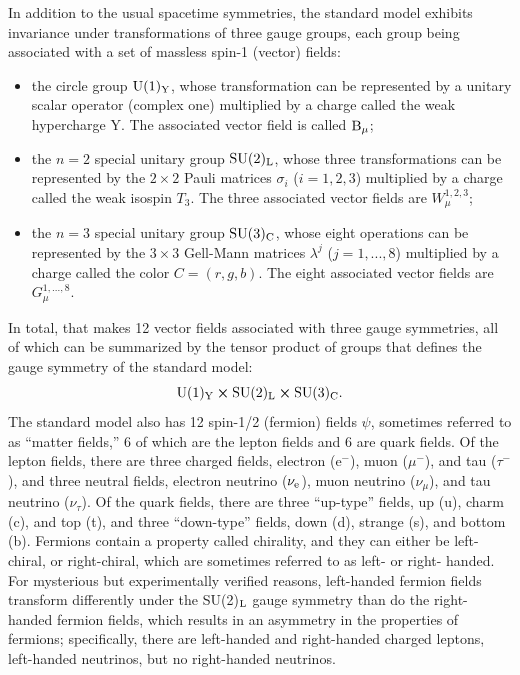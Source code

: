 In addition to the usual spacetime symmetries, the standard model exhibits invariance under transformations of three gauge groups, each group being associated with a set of massless spin-1 (vector) fields:
\begin{itemize}
\item the circle group $\rm U(1)_{Y}$, whose transformation can be represented by a unitary scalar operator (complex one) multiplied by a charge called the weak hypercharge Y. The associated vector field is called ${\rm B}_{\mu}$;
\item the $n=2$ special unitary group $\rm SU(2)_{L}$, whose three transformations can be represented by the $2\times2$ Pauli matrices $\sigma_{i}$ ($i=1,2,3$) multiplied by a charge called the weak isospin $T_3$. The three associated vector fields are $W_{\mu}^{1,2,3}$;
\item the $n=3$ special unitary group $\rm SU(3)_{C}$, whose eight operations can be represented by the $3\times3$ Gell-Mann matrices $\lambda^{j}$ ($j=1,...,8$) multiplied by a charge called the color $C=(r,g,b)$. The eight associated vector fields are $G_{\mu}^{1,...,8}$.
\end{itemize}
In total, that makes 12 vector fields associated with three gauge symmetries, all of which can be summarized by the tensor product of groups that defines the gauge symmetry of the standard model:
\begin{equation}
\rm U(1)_{Y} \cross \rm SU(2)_{L} \cross \rm SU(3)_{C}.
\label{eq:symm}
\end{equation}
The standard model also has 12 spin-1/2 (fermion) fields $\psi$, sometimes referred to as ``matter fields,'' 6 of which are the lepton fields and 6 are quark fields.  Of the lepton fields, there are three charged fields, electron (e$^-$), muon ($\mu^-$), and tau ($\tau^-$), and three neutral fields, electron neutrino ($\nu_{\rm e}$), muon neutrino ($\nu_{\mu}$), and tau neutrino ($\nu_{\tau}$). Of the quark fields, there are three ``up-type'' fields, up (u), charm (c), and top (t), and three ``down-type'' fields, down (d), strange (s), and bottom (b). Fermions contain a property called chirality, and they can either be left-chiral, or right-chiral, which are sometimes referred to as left- or right- handed. For mysterious but experimentally verified reasons, left-handed fermion fields transform differently under the SU(2)$_{\rm L}$ gauge symmetry than do the right-handed fermion fields, which results in an asymmetry in the properties of fermions; specifically, there are left-handed and right-handed charged leptons, left-handed neutrinos, but no right-handed neutrinos.

